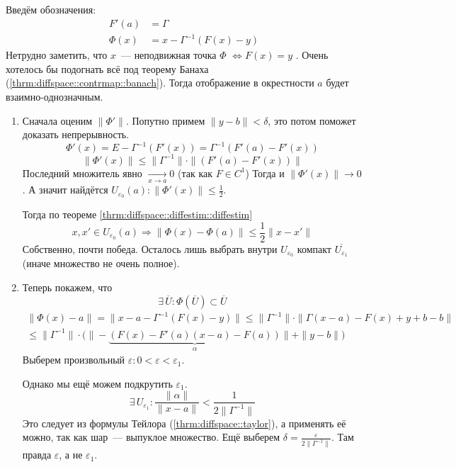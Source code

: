 \documentclass[12pt,timbord]{../../../notes}
\begin{document}
\begin{ittproof}
  Введём обозначения:
  \begin{align*}
    F'(a) &= \Gamma\\
    \Phi(x) &= x - \Gamma^{-1} (F(x) - y)
  \end{align*}
  Нетрудно заметить, что $x$~--- неподвижная точка $\Phi$ $\Leftrightarrow F(x)=y$ .
  Очень хотелось бы подогнать всё под теорему Банаха (\ref{thrm:diffspace::contrmap::banach}).
  Тогда отображение в окрестности $a$ будет взаимно-однозначным.

  \begin{enumerate}
    \item Сначала оценим $\|\Phi'\|$.
      Попутно примем $\|y-b\| < \delta$, это потом поможет доказать непрерывность.
      \[
        \Phi'(x) = E - \Gamma^{-1} (F'(x)) = \Gamma^{-1} (F'(a) - F'(x))
      \]
      \[
        \|\Phi'(x)\| \leqslant \| \Gamma^{-1} \| \cdot \| (F'(a) - F'(x)) \|
      \]
      Последний множитель явно $\xrightarrow[x\to a]{} 0$ (так как $F\in C^1$)
      Тогда и $\|\Phi'(x)\|\to 0$. А значит найдётся $U_{\varepsilon_0}(a) \colon 
      \|\Phi'(x)\| \leqslant \frac{1}{2}$.
      
      Тогда по теореме \ref{thrm:diffspace::diffestim::diffestim} 
      \[
        x, x' \in U_{\varepsilon_0}(a) \Rightarrow \| \Phi(x) - \Phi(a)\| \leqslant \frac{1}{2}
        \|x-x'\|
      \]
      Собственно, почти победа. Осталось лишь выбрать внутри $U_{\varepsilon_0}$ компакт
      $\overline{U_{\varepsilon_1}}$ (иначе множество не очень полное).

    \item Теперь покажем, что 
      \[
        \exists\, \overline{U} \colon \Phi(\overline{U}) \subset \overline{U}  
      \]
      \[
        \begin{split}
          \|\Phi(x) - a\| = \| x - a - \Gamma^{-1}(F(x)-y)\| 
          \leqslant \|\Gamma^{-1}\| \cdot \| \Gamma (x-a) - F(x) + y + b - b\| \\ 
          \leqslant \|\Gamma^{-1}\| 
          \cdot \bigl(\| - \underbrace{( F(x) - F'(a)(x-a) - F(a) )}_{\alpha}\| + \| y - b\| \bigr)
        \end{split}
      \]
      Выберем произвольный $\varepsilon \colon 0 < \varepsilon < \varepsilon_1$.
      
      Однако мы ещё можем подкрутить $\varepsilon_1$. 
      \[
        \exists\, U_{\varepsilon_1} \colon \frac{\|\alpha\|}{\|x-a\|} < \frac{1}{2\|\Gamma^{-1}\|}
      \]
      Это следует из формулы Тейлора (\ref{thrm:diffspace::taylor}), а применять её можно, так
      как шар~--- выпуклое множество. Ещё выберем $\delta = \frac{\varepsilon}{2\|\Gamma^{-1}\|}$.
      Там правда $\varepsilon$, а не $\varepsilon_1$.


\end{enumerate}
\end{ittproof}
\end{document}
